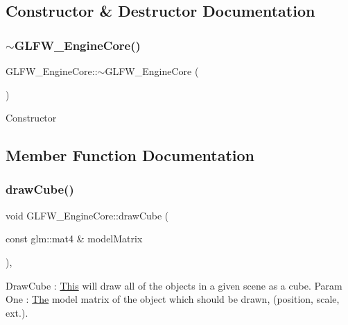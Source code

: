 \subsection{Constructor \& Destructor Documentation}
\mbox{\label{class_g_l_f_w___engine_core_adf17916892982f1103140b22dc1b37be}} 
\subsubsection{\texorpdfstring{$\sim$\+G\+L\+F\+W\+\_\+\+Engine\+Core()}{~GLFW\_EngineCore()}}
{\footnotesize\ttfamily G\+L\+F\+W\+\_\+\+Engine\+Core\+::$\sim$\+G\+L\+F\+W\+\_\+\+Engine\+Core (\begin{DoxyParamCaption}{ }\end{DoxyParamCaption})\hspace{0.3cm}{\ttfamily [override]}}

Constructor 

\subsection{Member Function Documentation}
\mbox{\label{class_g_l_f_w___engine_core_a728d1f6ffd1e8526611ab0856db537c0}} 
\subsubsection{\texorpdfstring{draw\+Cube()}{drawCube()}}
{\footnotesize\ttfamily void G\+L\+F\+W\+\_\+\+Engine\+Core\+::draw\+Cube (\begin{DoxyParamCaption}\item[{const glm\+::mat4 \&}]{model\+Matrix }\end{DoxyParamCaption})\hspace{0.3cm}{\ttfamily [override]}, {\ttfamily [virtual]}}

Draw\+Cube \+: \mbox{\hyperlink{class_this}{This}} will draw all of the objects in a given scene as a cube. Param One \+: \mbox{\hyperlink{class_the}{The}} model matrix of the object which should be drawn, (position, scale, ext.). 

